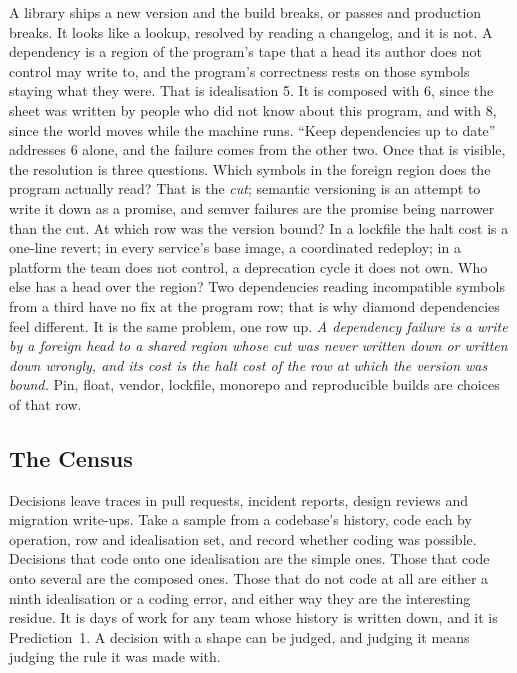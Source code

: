 \documentclass[11pt,oneside]{article}
\theoremstyle{definition}
\theoremstyle{remark}
\begin{document}
A library ships a new version and the build breaks, or passes and production breaks. It
looks like a lookup, resolved by reading a changelog, and it is not. A dependency is a
region of the program's tape that a head its author does not control may write to, and
the program's correctness rests on those symbols staying what they were. That is
idealisation 5. It is composed with 6, since the sheet was written by people who did not
know about this program, and with 8, since the world moves while the machine runs. ``Keep dependencies up to date'' addresses 6 alone, and the failure comes from the other two.
Once that is visible, the resolution is three questions. Which symbols in the foreign region does the program actually read? That is the
\emph{cut}; semantic versioning is an attempt to write it down as a promise, and semver
failures are the promise being narrower than the cut. At which row was the version bound?
In a lockfile the halt cost is a one-line revert; in every service's base image, a
coordinated redeploy; in a platform the team does not control, a deprecation cycle it does
not own. Who else has a head over the region? Two dependencies reading incompatible symbols
from a third have no fix at the program row; that is why diamond dependencies feel
different. It is the same problem, one row up. \emph{A dependency failure is a write by a foreign
head to a shared region whose cut was never written down or written down wrongly, and its
cost is the halt cost of the row at which the version was bound.} Pin, float, vendor,
lockfile, monorepo and reproducible builds are choices of that row.

\subsection{The Census}\label{sec:census}

Decisions leave traces in
pull requests, incident reports, design reviews and migration write-ups. Take a sample
from a codebase's history, code each by operation, row and idealisation set, and record
whether coding was possible. Decisions that code onto one idealisation are the simple ones. Those that code onto several are the composed ones. Those that do not code at all
are either a ninth idealisation or a coding error, and either way they are the interesting
residue. It is days of work for any team whose history is written down, and it is Prediction~1.
A decision with a shape can be judged, and judging it means judging the rule it was made
with.

\end{document}
